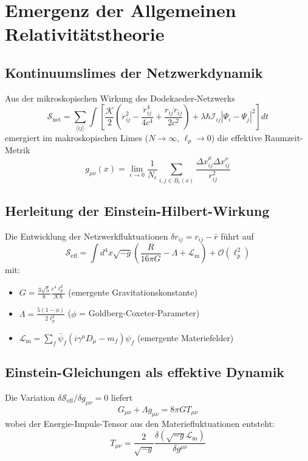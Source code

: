 \section{Emergenz der Allgemeinen Relativitätstheorie}
\label{sec:emergenz_art}

\subsection{Kontinuumslimes der Netzwerkdynamik}
Aus der mikroskopischen Wirkung des Dodekaeder-Netzwerks
\begin{equation}
\mathcal{S}_{\text{net}} = \sum_{\langle ij \rangle} \int \left[ \frac{\mathcal{K}}{2} \left( \dot{r}_{ij}^2 - \frac{\dot{r}_{ij}^4}{4c^4} + \frac{r_{ij}\ddot{r}_{ij}}{2c^2} \right) + \lambda \hbar \mathcal{I}_{ij} |\Psi_i - \Psi_j|^2 \right] dt
\end{equation}
emergiert im makroskopischen Limes ($N \to \infty$, $\ell_p \to 0$) die effektive Raumzeit-Metrik
\begin{equation}
g_{\mu\nu}(x) = \lim_{\epsilon \to 0} \frac{1}{N_\epsilon} \sum_{i,j \in B_\epsilon(x)} \frac{\Delta x_{ij}^\mu \Delta x_{ij}^\nu}{r_{ij}^2}
\end{equation}

\subsection{Herleitung der Einstein-Hilbert-Wirkung}
Die Entwicklung der Netzwerkfluktuationen $\delta r_{ij} = r_{ij} - \bar{r}$ führt auf
\begin{equation}
\mathcal{S}_{\text{eff}} = \int d^4x \sqrt{-g} \left( \frac{R}{16\pi G} - \Lambda + \mathcal{L}_{\text{m}} \right) + \mathcal{O}(\ell_p^2)
\end{equation}
mit:
\begin{itemize}
\item $G = \frac{3\sqrt{5}}{8} \frac{c^4\ell_p^2}{\mathcal{K}\hbar}$ (emergente Gravitationskonstante)
\item $\Lambda = \frac{5(1-\phi)}{2\ell_p^2}$ ($\phi$ = Goldberg-Coxeter-Parameter)
\item $\mathcal{L}_{\text{m}} = \sum_f \bar{\psi}_f (i\gamma^\mu D_\mu - m_f)\psi_f$ (emergente Materiefelder)
\end{itemize}

\subsection{Einstein-Gleichungen als effektive Dynamik}
Die Variation $\delta\mathcal{S}_{\text{eff}}/\delta g_{\mu\nu} = 0$ liefert
\begin{equation}
G_{\mu\nu} + \Lambda g_{\mu\nu} = 8\pi G T_{\mu\nu}
\end{equation}
wobei der Energie-Impuls-Tensor aus den Materiefluktuationen entsteht:
\begin{equation}
T_{\mu\nu} = \frac{2}{\sqrt{-g}} \frac{\delta (\sqrt{-g}\mathcal{L}_{\text{m}})}{\delta g^{\mu\nu}}
\end{equation}

